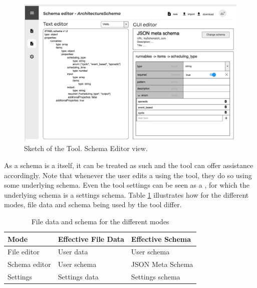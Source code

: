 \begin{figure}[!t]
    \includegraphics[width=\textwidth]{figures/mockup_gui_schema}
    \caption{Sketch of the Tool. Schema Editor view.}
    \label{mockup_gui_schema}
\end{figure}

As a schema is a \cfgfile{} itself, it can be treated as such and the tool can offer assistance accordingly.
Note that whenever the user edits a \cfgfile{} using the tool, they do so using some underlying schema.
Even the tool settings can be seen as a \cfgfile{}, for which the underlying schema is a settings schema.
Table \ref{tab:schema_and_file_data_by_mode} illustrates how for the different modes, file data and schema being used by the tool differ.
\begin{table}[!t]
\caption{File data and schema for the different modes}
\label{tab:schema_and_file_data_by_mode}
\centering
\begin{tabular}{lll}
\toprule
\textbf{Mode} & \textbf{Effective File Data} & \textbf{Effective Schema} \\
\midrule
File editor   & User data                    & User schema               \\
Schema editor & User schema                  & JSON Meta Schema          \\
Settings      & Settings data                & Settings schema           \\
\bottomrule
\end{tabular}
\end{table}





